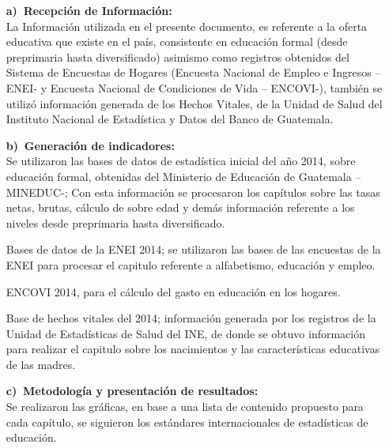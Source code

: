 
\appendix






\begin{itemize}
	
	
	\item[\large\textbf{a)}$\ $]	\textbf{\large Recepción de Información:} \\[-3mm]
	
		 La Información utilizada en el presente documento, es referente a la oferta educativa que existe en el país, consistente en educación formal (desde preprimaria hasta diversificado) asimismo como registros obtenidos del Sistema de Encuestas de Hogares (Encuesta Nacional de Empleo e Ingresos – ENEI- y Encuesta Nacional de Condiciones de Vida – ENCOVI-), también se utilizó información generada de los Hechos Vitales, de la Unidad de Salud del Instituto Nacional de Estadística y Datos del Banco de Guatemala.

	\item[\large\textbf{b)}$\ $]	\textbf{\large Generación de indicadores:} \\[-3mm]
	
		 Se utilizaron las bases de datos de estadística inicial del año 2014, sobre educación formal, obtenidas del Ministerio de Educación de Guatemala – MINEDUC-; Con esta información se procesaron los capítulos sobre las tasas netas, brutas, cálculo de sobre edad y demás información referente a los niveles desde preprimaria hasta diversificado.  
		 
		 Bases de datos de la ENEI 2014; se utilizaron las bases de las encuestas de la ENEI para procesar el capitulo referente a alfabetismo,  educación y empleo. 
		
		   ENCOVI 2014, para el cálculo del gasto en educación en los hogares.
		
		 Base de hechos vitales del 2014; información generada por los registros de la Unidad de Estadísticas de Salud del INE, de donde se obtuvo información para realizar el capitulo sobre los nacimientos y las características educativas de las madres.
		

		
	
		
	\item[\large\textbf{c)}$\ $]	\textbf{\large Metodología y presentación de resultados:} \\[-3mm]



 Se realizaron las gráficas, en base a una lista de contenido propuesto para cada capítulo, se siguieron los estándares internacionales de estadísticas de educación. 


\end{itemize}
